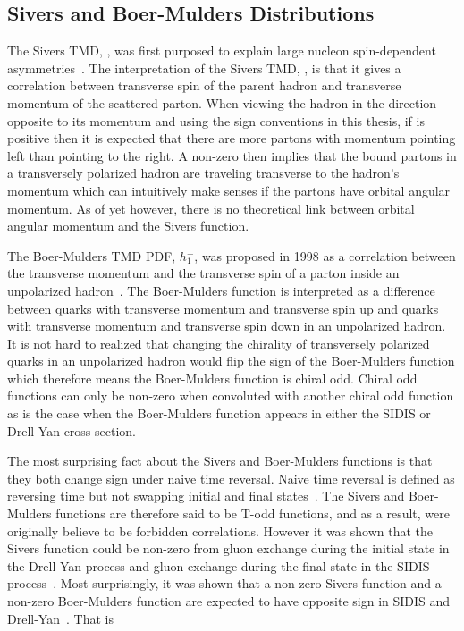\subsection{Sivers and Boer-Mulders Distributions}
The Sivers TMD, {\siv}, was first purposed to explain large nucleon
spin-dependent asymmetries~\cite{Sivers}.  The interpretation of the Sivers TMD,
{\siv}, is that it gives a correlation between transverse spin of the parent
hadron and transverse momentum of the scattered parton.  When viewing the hadron
in the direction opposite to its momentum and using the sign conventions in
this thesis, if {\siv} is positive then it is expected that there are more
partons with momentum pointing left than pointing to the right.  A non-zero
{\siv} then implies that the bound partons in a transversely polarized hadron
are traveling transverse to the hadron's momentum which can intuitively make
senses if the partons have orbital angular momentum.  As of yet however, there
is no theoretical link between orbital angular momentum and the Sivers function.

The Boer-Mulders TMD PDF, $h_1^{\perp}$, was proposed in 1998 as a correlation
between the transverse momentum and the transverse spin of a parton inside an
unpolarized hadron~\cite{Boer:1997nt}.  The Boer-Mulders function is interpreted
as a difference between quarks with transverse momentum and transverse spin up
and quarks with transverse momentum and transverse spin down in an unpolarized
hadron.  It is not hard to realized that changing the chirality of transversely
polarized quarks in an unpolarized hadron would flip the sign of the
Boer-Mulders function which therefore means the Boer-Mulders function is chiral
odd.  Chiral odd functions can only be non-zero when convoluted with another
chiral odd function as is the case when the Boer-Mulders function appears in
either the SIDIS or Drell-Yan cross-section.

The most surprising fact about the Sivers and Boer-Mulders functions is that
they both change sign under naive time reversal.  Naive time reversal is
defined as reversing time but not swapping initial and final
states~\cite{Bacchetta:2006tn}.  The Sivers and Boer-Mulders functions are
therefore said to be T-odd functions, and as a result, were originally believe
to be forbidden correlations.  However it was shown that the Sivers function
could be non-zero from gluon exchange during the initial state in the Drell-Yan
process and gluon exchange during the final state in the SIDIS
process~\cite{Brodsky:2002cx,Brodsky:2002rv}.  Most surprisingly, it was shown
that a non-zero Sivers function and a non-zero Boer-Mulders function are
expected to have opposite sign in SIDIS and Drell-Yan~\cite{collins_2002}.  That
is

